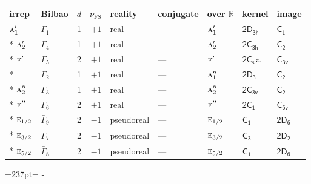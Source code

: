\documentclass[10pt,a4paper]{article}
\makeatletter
\def\grouprule#1#2{\noalign{\marks\LTgroupmarks{\the\belowrulesep}\nobreak\vskip#1%
  \vskip\aboverulesep}\multispan\LT@cols\unskip{\leaders\hrule\@height#2\hfill\kern\z@}\cr
  \noalign{\penalty\LTrulebreak\vskip\belowrulesep\global\@lastruleclass\z@}}
\newcommand{\needspace}[1]{\par\penalty-100\begingroup\dimen0=#1\relax\dimen2=\pagegoal
  \advance\dimen2-\pagetotal\ifdim\dimen0>\dimen2\relax\ifdim\dimen2>0pt\vfil\break\fi\fi
  \endgroup}
\numberwithin{equation}{section}
\newcommand{\grp}[1]{\mathsf{#1}}
\newcommand{\irr}[1]{\text{\normalfont\scshape #1}}
\newcommand{\detbox}[1]{{\setlength{\fboxsep}{1pt}\fbox{#1}}}
\newcommand{\clsletter}[1]{\,{\scriptsize\color{black!55}#1}}
\newcommand{\fsind}{\nu_{\mathrm{FS}}}
\makeatother
\begin{document}
\setlength{\emergencystretch}{2em}\par\setlength{\emergencystretch}{0pt}
{\small\renewcommand{\arraystretch}{1.25}\setlength{\tabcolsep}{4pt}\begin{longtable}{@{}llrrlllll@{}}\toprule
irrep & Bilbao & $d$ & $\fsind$ & reality & conjugate & over $\mathbb{R}$ & kernel & image\\\midrule\endhead
\bottomrule\endfoot\endlastfoot
$\irr{a}_{1}'$ & $\Gamma_{1}$ & 1 & $+1$ & real & --- & $\irr{a}_{1}'$ & \href{2D3h.pdf}{$\grp{2D_{3h}}$} & \href{../../../rotation/data/pdf/C1.pdf}{$\grp{C_{1}}$}\\*
$\irr{a}_{2}'$ & $\Gamma_{4}$ & 1 & $+1$ & real & --- & $\irr{a}_{2}'$ & \href{2C3h.pdf}{$\grp{2C_{3h}}$} & \href{../../../rotation/data/pdf/C2.pdf}{$\grp{C_{2}}$}\\*
$\irr{e}'$ & $\Gamma_{5}$ & 2 & $+1$ & real & --- & $\irr{e}'$ & \href{2C1v.pdf}{$\grp{2C_{s}}$}\clsletter{a} & \href{../../../rotation/data/pdf/C3v.pdf}{$\grp{C_{3v}}$}\\*
\detbox{$\irr{a}_{1}''$} & $\Gamma_{2}$ & 1 & $+1$ & real & --- & $\irr{a}_{1}''$ & \href{2D3.pdf}{$\grp{2D_{3}}$} & \href{../../../rotation/data/pdf/C2.pdf}{$\grp{C_{2}}$}\\*
$\irr{a}_{2}''$ & $\Gamma_{3}$ & 1 & $+1$ & real & --- & $\irr{a}_{2}''$ & \href{2C3v.pdf}{$\grp{2C_{3v}}$} & \href{../../../rotation/data/pdf/C2.pdf}{$\grp{C_{2}}$}\\*
$\irr{e}''$ & $\Gamma_{6}$ & 2 & $+1$ & real & --- & $\irr{e}''$ & \href{2C1.pdf}{$\grp{2C_{1}}$} & \href{../../../rotation/data/pdf/C6v.pdf}{$\grp{C_{6v}}$}\\*
\grouprule{0pt}{\lightrulewidth}
$\irr{e}_{1/2}$ & $\bar{\Gamma}_{9}$ & 2 & $-1$ & pseudoreal & --- & $\irr{e}_{1/2}$ & \href{C1.pdf}{$\grp{C_{1}}$} & \href{2D6.pdf}{$\grp{2D_{6}}$}\\*
$\irr{e}_{3/2}$ & $\bar{\Gamma}_{7}$ & 2 & $-1$ & pseudoreal & --- & $\irr{e}_{3/2}$ & \href{C3.pdf}{$\grp{C_{3}}$} & \href{2D2.pdf}{$\grp{2D_{2}}$}\\*
$\irr{e}_{5/2}$ & $\bar{\Gamma}_{8}$ & 2 & $-1$ & pseudoreal & --- & $\irr{e}_{5/2}$ & \href{C1.pdf}{$\grp{C_{1}}$} & \href{2D6.pdf}{$\grp{2D_{6}}$}\\
\bottomrule\end{longtable}}
\needspace{237pt}
\end{document}
